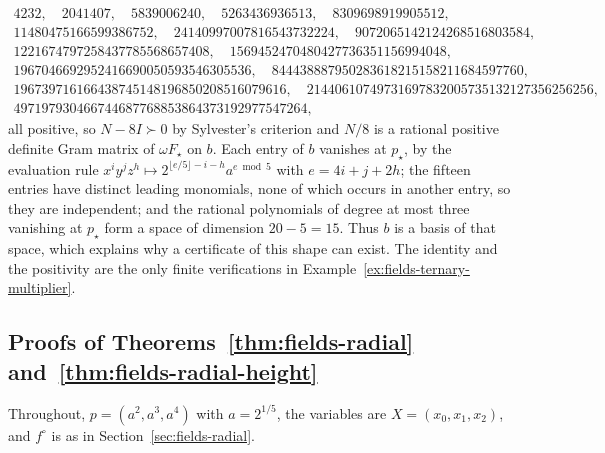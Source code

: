 {\small
\[
\begin{gathered}
4232,\quad 2041407,\quad 5839006240,\quad 5263436936513,\quad
8309698919905512,\\
11480475166599386752,\quad 24140997007816543732224,\quad
9072065142124268516803584,\\
1221674797258437785568657408,\quad
1569452470480427736351156994048,\\
1967046692952416690050593546305536,\quad
844438887950283618215158211684597760,\\
196739716166438745148196850208516079616,\quad
21440610749731697832005735132127356256256,\\
497197930466744687768853864373192977547264,
\end{gathered}
\]}
all positive, so $N-8I\succ0$ by Sylvester's criterion and $N/8$ is a rational
positive definite Gram matrix of $\omega F_\star$ on $b$. Each entry of $b$
vanishes at $p_\star$, by the evaluation rule
$x^iy^jz^h\mapsto2^{\lfloor e/5\rfloor-i-h}a^{e\bmod5}$ with $e=4i+j+2h$;
the fifteen entries have distinct leading monomials, none of which occurs in
another entry, so they are independent; and the rational polynomials of
degree at most three vanishing at $p_\star$ form a space of dimension
$20-5=15$. Thus $b$ is a basis of that space, which explains why a certificate
of this shape can exist. The identity and the positivity are the only finite
verifications in Example~\ref{ex:fields-ternary-multiplier}.

\subsection{Proofs of Theorems~\ref{thm:fields-radial}
and~\ref{thm:fields-radial-height}}
\label{app:fields-radial}

Throughout, $p=(a^2,a^3,a^4)$ with $a=2^{1/5}$, the variables are
$X=(x_0,x_1,x_2)$, and $f^\circ$ is as in Section~\ref{sec:fields-radial}.

